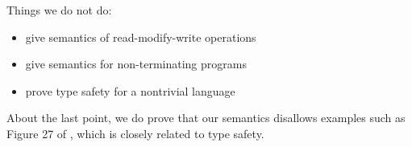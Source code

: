 Things we do not do:
\begin{itemize}
\item give semantics of read-modify-write operations
\item give semantics for non-terminating programs
\item prove type safety for a nontrivial language
\end{itemize}
About the last point, we do prove that our semantics disallows examples such
as Figure 27 of \cite{DBLP:journals/toplas/Lochbihler13}, which is closely
related to type safety.


